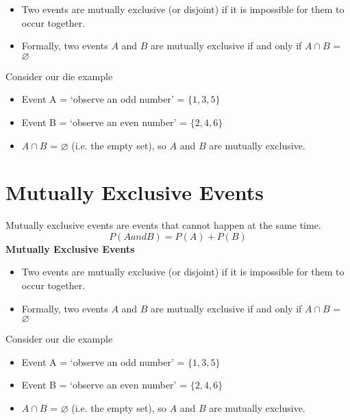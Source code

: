 \documentclass[]{report}
\begin{document}
\begin{itemize}
\item Two events are mutually exclusive (or disjoint) if it is impossible for
them to occur together.
\item Formally, two events $A$ and $B$ are mutually exclusive if and only if
$A\cap B$ = $\varnothing$ \end{itemize}\bigskip
Consider our die example
\begin{itemize}
\item Event A = `observe an odd number' = $\{1,3,5\}$
\item Event B = `observe an even number' = $\{2,4,6\}$

\item $A\cap B$ = $\varnothing$ (i.e. the empty set), so $A$ and $B$ are mutually exclusive.
\end{itemize}



\section{Mutually Exclusive Events}
Mutually exclusive events are events that cannot happen at the same time.
\[ P(A and B) = P(A) + P(B) \]
\noindent \textbf{Mutually Exclusive Events}
\begin{itemize}
\item Two events are mutually exclusive (or disjoint) if it is impossible for
them to occur together.
\item Formally, two events $A$ and $B$ are mutually exclusive if and only if
$A\cap B$ = $\varnothing$ \end{itemize}\bigskip
Consider our die example
\begin{itemize} 
\item Event A = `observe an odd number' = $\{1,3,5\}$
\item Event B = `observe an even number' = $\{2,4,6\}$

\item $A\cap B$ = $\varnothing$ (i.e. the empty set), so $A$ and $B$ are mutually exclusive.
\end{itemize}
\end{document}
